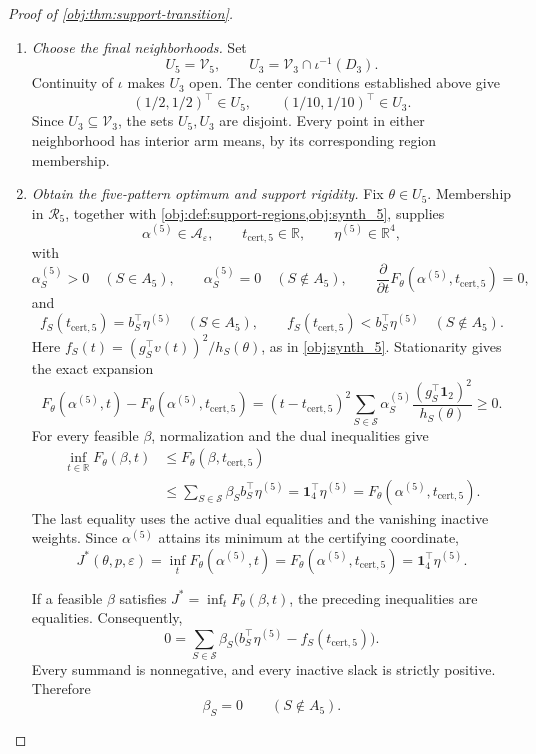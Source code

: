 \documentclass[11pt]{article}
\begin{document}
\begin{proof}[Proof of \cref{obj:thm:support-transition}]
\begin{enumerate}
\item \emph{Choose the final neighborhoods.}
Set
\[
U_5=\mathcal V_5,
\qquad
U_3=\mathcal V_3\cap\iota^{-1}(D_3).
\]
Continuity of \(\iota\) makes \(U_3\) open. The center conditions established above give
\[
(1/2,1/2)^\top\in U_5,
\qquad
(1/10,1/10)^\top\in U_3.
\]
Since \(U_3\subseteq\mathcal V_3\), the sets \(U_5,U_3\) are disjoint. Every point in either neighborhood has interior arm means, by its corresponding region membership.

\item \emph{Obtain the five-pattern optimum and support rigidity.}
Fix \(\theta\in U_5\). Membership in \(\mathcal R_5\), together with
\cref{obj:def:support-regions,obj:synth_5}, supplies
\[
\alpha^{(5)}\in\mathcal A_\varepsilon,\qquad
t_{\mathrm{cert},5}\in\mathbb R,\qquad
\eta^{(5)}\in\mathbb R^4,
\]
with
\[
\alpha^{(5)}_S>0\quad(S\in A_5),\qquad
\alpha^{(5)}_S=0\quad(S\notin A_5),
\qquad
\frac{\partial}{\partial t}
F_\theta(\alpha^{(5)},t_{\mathrm{cert},5})=0,
\]
and
\[
f_S(t_{\mathrm{cert},5})=
 b_S^\top\eta^{(5)}\quad(S\in A_5),
\qquad
f_S(t_{\mathrm{cert},5})<
 b_S^\top\eta^{(5)}\quad(S\notin A_5).
\]
Here \(f_S(t)=(g_S^\top v(t))^2/h_S(\theta)\), as in
\cref{obj:synth_5}. Stationarity gives the exact expansion
\[
F_\theta(\alpha^{(5)},t)-F_\theta(\alpha^{(5)},t_{\mathrm{cert},5})
=(t-t_{\mathrm{cert},5})^2
 \sum_{S\in\mathcal S}
 \alpha^{(5)}_S\frac{(g_S^\top\mathbf1_2)^2}{h_S(\theta)}
\ge0.
\]
For every feasible \(\beta\), normalization and the dual inequalities give
\[
\begin{aligned}
\inf_{t\in\mathbb R}F_\theta(\beta,t)
&\le F_\theta(\beta,t_{\mathrm{cert},5})\\
&\le\sum_{S\in\mathcal S}\beta_S b_S^\top\eta^{(5)}
=\mathbf1_4^\top\eta^{(5)}
=F_\theta(\alpha^{(5)},t_{\mathrm{cert},5}).
\end{aligned}
\]
The last equality uses the active dual equalities and the vanishing inactive weights. Since \(\alpha^{(5)}\) attains its minimum at the certifying coordinate,
\[
J^*(\theta,p,\varepsilon)
=\inf_tF_\theta(\alpha^{(5)},t)
=F_\theta(\alpha^{(5)},t_{\mathrm{cert},5})
=\mathbf1_4^\top\eta^{(5)}.
\]

If a feasible \(\beta\) satisfies \(J^*=\inf_tF_\theta(\beta,t)\), the preceding inequalities are equalities. Consequently,
\[
0=\sum_{S\in\mathcal S}\beta_S
 \bigl(b_S^\top\eta^{(5)}-f_S(t_{\mathrm{cert},5})\bigr).
\]
Every summand is nonnegative, and every inactive slack is strictly positive. Therefore
\[
\beta_S=0\qquad(S\notin A_5).
\]


\end{enumerate}
\end{proof}
\end{document}
